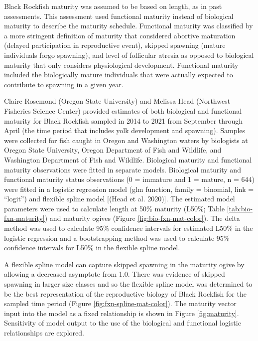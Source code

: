 \documentclass[11pt,
  letterpaper,
]{article}
\begin{document}
Black Rockfish maturity was assumed to be based on length, as in past assessments. This assessment used functional maturity instead of biological maturity to describe the maturity schedule. Functional maturity was classified by a more stringent definition of maturity that considered abortive maturation (delayed participation in reproductive event), skipped spawning (mature individuals forgo spawning), and level of follicular atresia as opposed to biological maturity that only considers physiological development. Functional maturity included the biologically mature individuals that were actually expected to contribute to spawning in a given year.

Claire Rosemond (Oregon State University) and Melissa Head (Northwest Fisheries Science Center) provided estimates of both biological and functional maturity for Black Rockfish sampled in 2014 to 2021 from September through April (the time period that includes yolk development and spawning). Samples were collected for fish caught in Oregon and Washington waters by biologists at Oregon State University, Oregon Department of Fish and Wildlife, and Washington Department of Fish and Wildlife. Biological maturity and functional maturity observations were fitted in separate models. Biological maturity and functional maturity status observations (0 = immature and 1 = mature, n = 644) were fitted in a logistic regression model (glm function, family = binomial, link = ``logit'') and flexible spline model {[}(Head et al. 2020){]}. The estimated model parameters were used to calculate length at 50\% maturity (L50\%; Table \ref{tab:bio-fxn-maturity}) and maturity ogives (Figure \ref{fig:bio-fxn-mat-color}). The delta method was used to calculate 95\% confidence intervals for estimated L50\% in the logistic regression and a bootstrapping method was used to calculate 95\% confidence intervals for L50\% in the flexible spline model.

A flexible spline model can capture skipped spawning in the maturity ogive by allowing a decreased asymptote from 1.0. There was evidence of skipped spawning in larger size classes and so the flexible spline model was determined to be the best representation of the reproductive biology of Black Rockfish for the sampled time period (Figure \ref{fig:fxn-spline-mat-color}). The maturity vector input into the model as a fixed relationship is shown in Figure \ref{fig:maturity}. Sensitivity of model output to the use of the biological and functional logistic relationships are explored.
\end{document}
